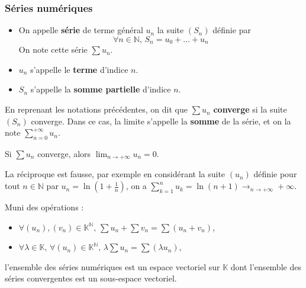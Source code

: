 	\subsubsection{Séries numériques}
	
	
	\begin{definition}
		\begin{itemize}
			\item On appelle \textbf{série} de terme général $u_n$ la suite $(S_n)$ définie par
			\[ \forall n \in \mathbb{N}, \, S_n = u_0 + \dots + u_n \]
			On note cette série $\sum u_n$.
			\item $u_n$ s'appelle le \textbf{terme} d'indice $n$.
			\item $S_n$ s'appelle la \textbf{somme partielle} d'indice $n$.
		\end{itemize}
	\end{definition}
	
	\begin{definition}
		En reprenant les notations précédentes, on dit que $\sum u_n$ \textbf{converge} si la suite $(S_n)$ converge. Dans ce cas, la limite s'appelle la \textbf{somme} de la série, et on la note $\sum_{n=0}^{+\infty} u_n$.
	\end{definition}
	
	
	\begin{proposition}
		Si $\sum u_n$ converge, alors $\lim_{n \rightarrow +\infty} u_n = 0$.
	\end{proposition}
	
	\begin{cexample}
		La réciproque est fausse, par exemple en considérant la suite $(u_n)$ définie pour tout $n \in \mathbb{N}$ par $u_n = \ln(1 + \frac{1}{n})$, on a $\sum_{k=1}^{n} u_k = \ln(n+1) \longrightarrow_{n \rightarrow +\infty} +\infty$.
	\end{cexample}
	
	\begin{proposition}
		Muni des opérations :
		\begin{itemize}
			\item $\forall (u_n), (v_n) \in \mathbb{K}^{\mathbb{N}}, \, \sum u_n + \sum v_n = \sum (u_n + v_n)$,
			\item $\forall \lambda \in \mathbb{K}, \, \forall (u_n) \in \mathbb{K}^{\mathbb{N}}, \, \lambda \sum u_n = \sum (\lambda u_n)$,
		\end{itemize}
		l'ensemble des séries numériques est un espace vectoriel sur $\mathbb{K}$ dont l'ensemble des séries convergentes est un sous-espace vectoriel.
	\end{proposition}
	
